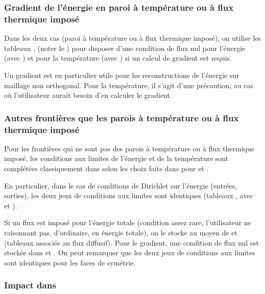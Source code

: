 \subsubsection*{Gradient de l'énergie en paroi à température ou à flux thermique imposé}

Dans les deux cas (paroi à température ou à flux thermique imposé),
on utilise les tableaux
,
 (noter le ) pour disposer d'une
condition de flux nul pour l'énergie (avec ) et
pour la température (avec )
si un calcul de gradient est requis.

Un gradient est en particulier utile pour les reconstructions
de l'énergie sur maillage non orthogonal.
Pour la température, il s'agit d'une précaution, au cas
où l'utilisateur aurait besoin d'en calculer le gradient.

\subsubsection*{Autres frontières que les parois à température ou à flux thermique imposé}

Pour les frontières qui ne sont pas des parois à température ou
à flux thermique imposé, les conditions aux limites de l'énergie et
de la température sont complétées classiquement dans  selon
les choix faits dans  pour  et .

En particulier,
dans le cas de conditions de Dirichlet sur l'énergie (entrées, sorties), les
deux jeux de conditions aux limites sont identiques (tableaux
,  avec  et ).

Si un flux est imposé pour l'énergie totale (condition assez rare,
l'utilisateur ne raisonnant pas,
d'ordinaire, en énergie totale), on le stocke au moyen de
 et
 (tableaux associés au flux
diffusif). Pour le gradient, une condition de flux nul est stockée
dans
 et
. On peut remarquer que les deux
jeux de conditions aux limites sont identiques pour les faces de symétrie.

\subsubsection*{Impact dans }

